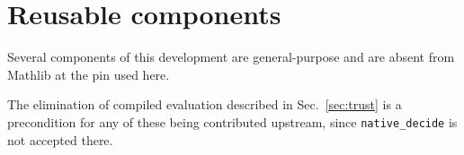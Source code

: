 \documentclass[aps,pra,reprint,nofootinbib,superscriptaddress]{revtex4-2}
\newcommand{\lean}[1]{\texttt{#1}}
\theoremstyle{plain}
\theoremstyle{definition}
\begin{document}
\section{Reusable components}
\label{app:reusable}

Several components of this development are general-purpose and are absent from
Mathlib at the pin used here.

\begin{table}[h]
\caption{Components with use beyond this development.}
\label{tab:reusable}
\begin{ruledtabular}

\end{ruledtabular}
\end{table}

The elimination of compiled evaluation described in Sec.~\ref{sec:trust} is a
precondition for any of these being contributed upstream, since
\lean{native\_decide} is not accepted there.



\end{document}
